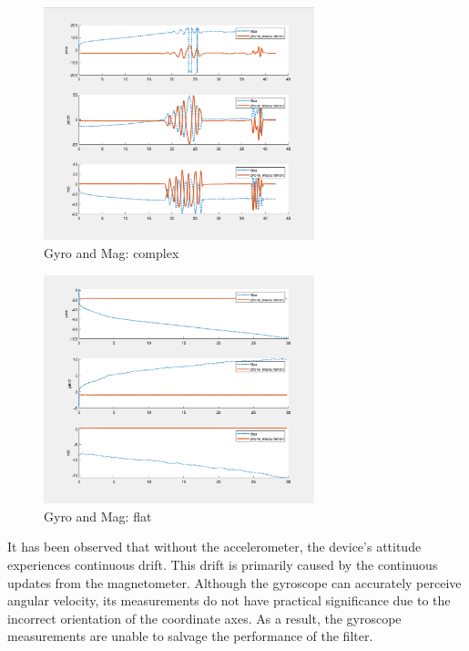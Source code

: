 \begin{figure}[H]
 \centering
 \includegraphics[width=0.7\textwidth]{images/Gyroandmag.png}
 \caption{Gyro and Mag: complex}
 \label{gmcomplex}
\end{figure}

\begin{figure}[H]
 \centering
 \includegraphics[width=0.7\textwidth]{images/gyromagflat.png}
 \caption{Gyro and Mag: flat}
 \label{flat}
\end{figure}

It has been observed that without the accelerometer, the device's attitude experiences continuous drift. This drift is primarily caused by the continuous updates from the magnetometer. Although the gyroscope can accurately perceive angular velocity, its measurements do not have practical significance due to the incorrect orientation of the coordinate axes. As a result, the gyroscope measurements are unable to salvage the performance of the filter.